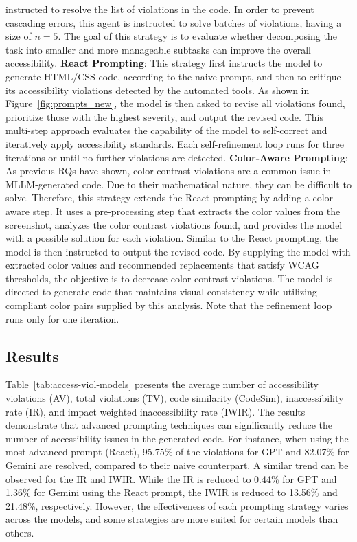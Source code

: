   instructed to resolve the list of violations in the code. In order to 
  prevent cascading errors, this agent is instructed to solve batches 
  of violations, having a size of \(n = 5\). The goal of this strategy 
  is to evaluate whether decomposing the task into smaller and more 
  manageable subtasks can improve the overall accessibility.\newline
\noindent
\textbf{React Prompting}: 
  This strategy first instructs the model to generate HTML/CSS code, 
  according to the naive prompt, and then to critique its accessibility
  violations detected by the automated tools. As shown in 
  Figure~\ref{fig:prompts_new}, the model is then asked to revise
  all violations found, prioritize those with the highest 
  severity, and output the revised code.
  This multi-step approach evaluates the capability of the model to 
  self-correct and iteratively apply accessibility standards. 
  Each self-refinement loop runs for three iterations or until 
  no further violations are detected.\newline
\noindent
\textbf{Color-Aware Prompting}: 
  As previous RQs have shown, color contrast violations are a common 
  issue in MLLM-generated code. Due to their mathematical nature, they
  can be difficult to solve. Therefore, this strategy extends the React 
  prompting by adding a color-aware step. It uses a pre-processing 
  step that extracts the color values from the screenshot, analyzes 
  the color contrast violations found, and provides the model with a 
  possible solution for each violation. Similar to the React prompting,
  the model is then instructed to output the revised code. 
  By supplying the model with extracted color values and recommended 
  replacements that satisfy WCAG thresholds, the objective is to 
  decrease color contrast violations. The model is 
  directed to generate code that maintains visual consistency while 
  utilizing compliant color pairs supplied by this analysis.
  Note that the refinement loop runs only for one iteration.\newline




\subsection{Results}
Table~\ref{tab:access-viol-models} presents the average number of accessibility 
violations (AV), total violations (TV), code similarity (CodeSim),
inaccessibility rate (IR), and impact weighted inaccessibility rate (IWIR).
The results demonstrate that advanced prompting techniques can significantly
reduce the number of accessibility issues in the generated code. For instance,
when using the most advanced prompt (React), 95.75\% of the violations for 
GPT and 82.07\% for Gemini are resolved, compared to their naive counterpart.
A similar trend can be observed for the IR and IWIR. While the 
IR is reduced to 0.44\% for GPT and 1.36\% for Gemini using the React 
prompt, the IWIR is reduced to 13.56\% and 21.48\%, respectively. However, 
the effectiveness of each prompting strategy varies across the models, and 
some strategies are more suited for certain models than others.



